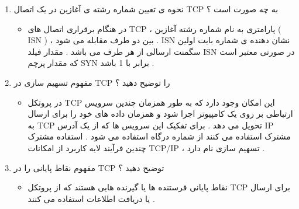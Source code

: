 \documentclass{article}
\begin{document}
\begin{enumerate}
\item نحوه ی تعیین شماره رشته ی آغازین در یک اتصال TCP به چه صورت است ؟

\begin{tcolorbox}
\begin{itemize}
	\item در هنگام برقراری اتصال های TCP
	، پارامتری به نام شماره رشته آغازین ( ISN ) ، بین دو طرف مقابله می شود . ISN نشان دهنده ی شماره بایت اولین سگمنت ارسالی از هر طرف می باشد . مقدار فیلد ISN در صورتی معتبر است که مقدار پرچم SYN برابر با 1 باشد .
\end{itemize}
\end{tcolorbox}

\item مفهوم تسهیم سازی در TCP را توضیح دهید ؟

\begin{tcolorbox}
\begin{itemize}
	\item در پروتکل TCP 
	این امکان وجود دارد که به طور همزمان چندین سرویس ارتباطی بر روی یک کامپیوتر اجرا شود و همزمان داده های خود را برای ارسال به TCP تحویل می دهد .
	برای تفکیک این سرویس ها که از یک آدرس IP مشترک استفاده می کنند از شماره درگاه استفاده می شود .
	استفاده مشترک چندین فرآیند لایه کاربرد از امکانات TCP/IP ، تسهیم سازی نام دارد .
\end{itemize}
\end{tcolorbox}

\item مفهوم نقاط پایانی را در TCP توضیح دهید ؟

\begin{tcolorbox}
\begin{itemize}
	\item نقاط پایانی فرستنده ها یا گیرنده هایی هستند که از پروتکل TCP برای ارسال یا دریافت اطلاعات استفاده می کنند .
\end{itemize}
\end{tcolorbox}

\end{enumerate}
\end{document}
